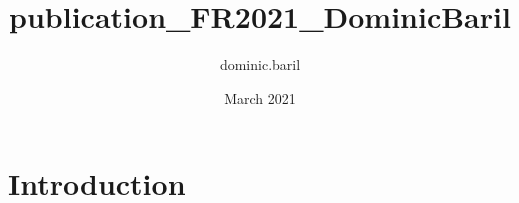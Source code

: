 \documentclass{article}
\title{publication_FR2021_DominicBaril}
\author{dominic.baril }
\date{March 2021}
\begin{document}
\maketitle

\section{Introduction}
\end{document}
